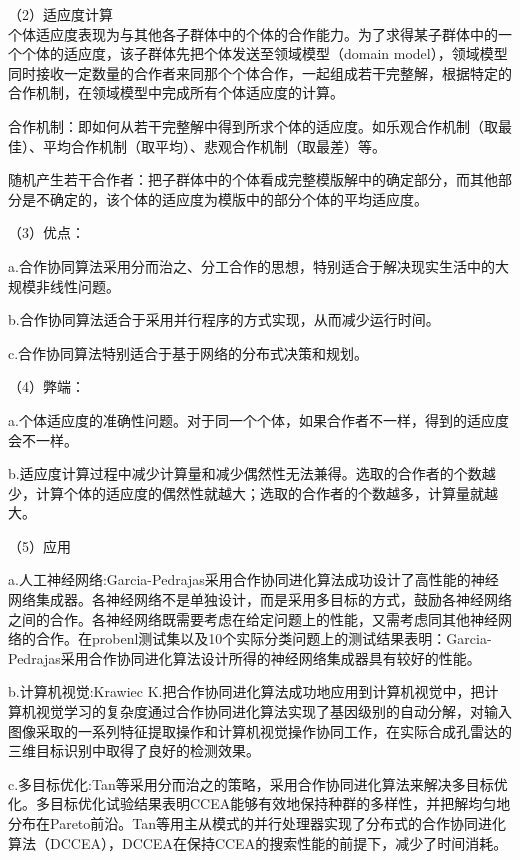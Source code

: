 \documentclass[8pt]{article}
\begin{document}
\begin{description}
        \item（2）适应度计算\\
        个体适应度表现为与其他各子群体中的个体的合作能力。为了求得某子群体中的一个个体的适应度，该子群体先把个体发送至领域模型（domain model），领域模型同时接收一定数量的合作者来同那个个体合作，一起组成若干完整解，根据特定的合作机制，在领域模型中完成所有个体适应度的计算。
        \item 合作机制：即如何从若干完整解中得到所求个体的适应度。如乐观合作机制（取最佳）、平均合作机制（取平均）、悲观合作机制（取最差）等。
        \item 随机产生若干合作者：把子群体中的个体看成完整模版解中的确定部分，而其他部分是不确定的，该个体的适应度为模版中的部分个体的平均适应度。
      \item（3）优点：
      \item a.合作协同算法采用分而治之、分工合作的思想，特别适合于解决现实生活中的大规模非线性问题。
      \item b.合作协同算法适合于采用并行程序的方式实现，从而减少运行时间。
      \item c.合作协同算法特别适合于基于网络的分布式决策和规划。    
      \item（4）弊端：
      \item a.个体适应度的准确性问题。对于同一个个体，如果合作者不一样，得到的适应度会不一样。
      \item b.适应度计算过程中减少计算量和减少偶然性无法兼得。选取的合作者的个数越少，计算个体的适应度的偶然性就越大；选取的合作者的个数越多，计算量就越大。
      \item（5）应用\\
      \item a.人工神经网络:Garcia-Pedrajas采用合作协同进化算法成功设计了高性能的神经网络集成器。各神经网络不是单独设计，而是采用多目标的方式，鼓励各神经网络之间的合作。各神经网络既需要考虑在给定问题上的性能，又需考虑同其他神经网络的合作。在probenl测试集以及10个实际分类问题上的测试结果表明：Garcia-Pedrajas采用合作协同进化算法设计所得的神经网络集成器具有较好的性能。
      \item b.计算机视觉:Krawiec K.把合作协同进化算法成功地应用到计算机视觉中，把计算机视觉学习的复杂度通过合作协同进化算法实现了基因级别的自动分解，对输入图像采取的一系列特征提取操作和计算机视觉操作协同工作，在实际合成孔雷达的三维目标识别中取得了良好的检测效果。
      \item c.多目标优化:Tan等采用分而治之的策略，采用合作协同进化算法来解决多目标优化。多目标优化试验结果表明CCEA能够有效地保持种群的多样性，并把解均匀地分布在Pareto前沿。Tan等用主从模式的并行处理器实现了分布式的合作协同进化算法（DCCEA），DCCEA在保持CCEA的搜索性能的前提下，减少了时间消耗。      

\end{description}
\end{document}
